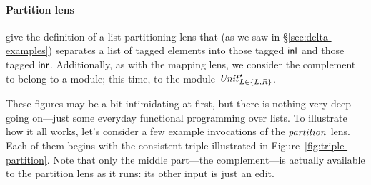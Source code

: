 \paragraph*{Partition lens}
\partitionfigures give the definition of a list partitioning lens that (as
we saw in \S \ref{sec:delta-examples}) separates a list of tagged elements
into those tagged $\mathsf{inl}$ and those tagged $\mathsf{inr}$. Additionally, as
with the mapping lens, we consider the complement to belong to a module;
this time, to the module $\mathit{Unit}_{L\in\{L,R\}}^\star$.

These figures may be a bit intimidating at first, but there is 
nothing very deep going on---just some everyday functional programming over
lists.  
To illustrate how it all works, let's consider a few example invocations
of the $\mathit{partition}$ lens. Each of them begins with the consistent triple
illustrated in Figure~\ref{fig:triple-partition}.  \iflater{}\fi
%
Note that only the middle part---the complement---is actually available
to the partition lens as it runs: its other input is just an edit.

